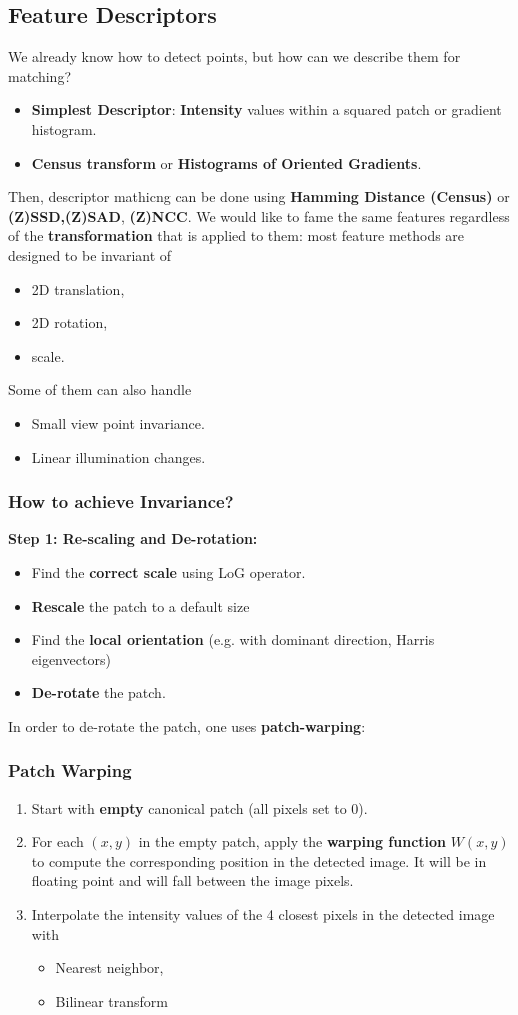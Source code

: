 \documentclass[a4paper,12 pt]{article}
\theoremstyle{definition}
\theoremstyle{remark}
\theoremstyle{definition}
\theoremstyle{definition}
\theoremstyle{definition}
\theoremstyle{remark}
\theoremstyle{definition}
\begin{document}
\subsection*{Feature Descriptors}
We already know how to detect points, but how can we describe them for matching?
\begin{itemize}
\item \textbf{Simplest Descriptor}: \textbf{Intensity} values within a squared patch or gradient histogram.
\item \textbf{Census transform} or \textbf{Histograms of Oriented Gradients}.
\end{itemize}
Then, descriptor mathicng can be done using \textbf{Hamming Distance (Census)} or \textbf{(Z)SSD,(Z)SAD}, \textbf{(Z)NCC}. We would like to fame the same features regardless of the \textbf{transformation} that is applied to them: most feature methods are designed to be invariant of
\begin{itemize}
\item 2D translation,
\item 2D rotation,
\item scale.
\end{itemize}
Some of them can also handle
\begin{itemize}
\item Small view point invariance.
\item Linear illumination changes.
\end{itemize}
\subsubsection*{How to achieve Invariance?}
\textbf{Step 1: Re-scaling and De-rotation:}
\begin{itemize}
\item Find the \textbf{correct scale} using LoG operator.
\item \textbf{Rescale} the patch to a default size
\item Find the \textbf{local orientation} (e.g. with dominant direction, Harris eigenvectors)
\item \textbf{De-rotate} the patch. 
\end{itemize}
In order to de-rotate the patch, one uses \textbf{patch-warping}:
\subsubsection*{Patch Warping}
\begin{enumerate}
\item Start with \textbf{empty} canonical patch (all pixels set to 0).
\item For each $(x,y)$ in the empty patch, apply the \textbf{warping function} $W(x,y)$ to compute the corresponding position in the detected image. It will be in floating point and will fall between the image pixels.
\item Interpolate the intensity values of the 4 closest pixels in the detected image with
\begin{itemize}
\item Nearest neighbor,
\item Bilinear transform
\end{itemize}
\end{enumerate}
\end{document}
